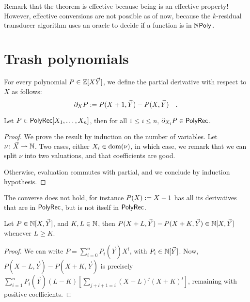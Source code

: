 Remark that the theorem is effective because being 
is an effective property! However, effective conversions are not possible as of
now, because the $k$-residual transducer algorithm uses an oracle to decide if
a function is in $\NPoly$.


\section{Trash polynomials}

\begin{definition}
    For every polynomial $P \in \mathbb{Z}[X \vec{Y}]$, we define 
    the partial derivative with respect to $X$ as follows:
    \begin{equation*}
        \partial_X P \mathrel{:=} P(X + 1, \vec{Y}) - P(X, \vec{Y}) \quad .
    \end{equation*}
\end{definition}

\begin{fact}
    Let $P \in \mathsf{PolyRec}[X_1, \dots, X_n]$, then
    for all $1 \leq i \leq n$,
    $\partial_{X_i} P \in \mathsf{PolyRec}$.
\end{fact}
\begin{proof}
    We prove the result by induction on the number of variables.
    Let $\nu \colon \vec{X} \rightharpoonup \mathbb{N}$.
    Two cases, either $X_i \in \operatorname{dom}(\nu)$,
    in which case, we remark that
    we can split $\nu$ into two valuations,
    and that coefficients are good.

    Otherwise, evaluation commutes with partial,
    and we conclude by induction hypothesis.
\end{proof}

\begin{remark}
    The converse does not hold,
    for instance $P(X) \mathrel{:=} X - 1$ has all its derivatives
    that are in $\mathsf{PolyRec}$, but is not itself in $\mathsf{PolyRec}$.
\end{remark}

\begin{fact}
    Let $P \in \mathbb{N}[X,\vec{Y}]$, and $K,L \in \mathbb{N}$,
    then $P(X+L, \vec{Y}) - P(X+K,\vec{Y}) \in \mathbb{N}[X, \vec{Y}]$
    whenever $L \geq K$.
\end{fact}
\begin{proof}
    We can write
    $P = \sum_{i = 0}^n P_i(\vec{Y}) X^i$, with $P_i \in \mathbb{N}[\vec{Y}]$.
    Now,
    $P(X+L,\vec{Y}) - P(X+K,\vec{Y})$
    is precisely
    $\sum_{i = 1}^n P_i(\vec{Y}) (L-K) \left[ \sum_{j + l + 1= i} (X+L)^j (X+K)^l \right]$,
    remaining with positive coefficients.
\end{proof}

